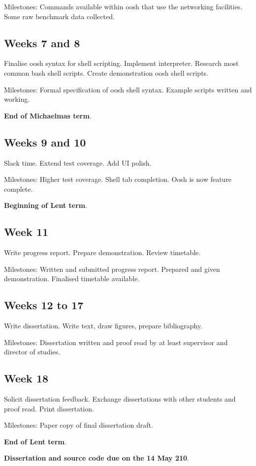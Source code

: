 \documentclass[12pt]{article}
\begin{document}
Milestones: Commands available within oosh that use the networking
facilities. Some raw benchmark data collected.

\subsection*{Weeks 7 and 8}
Finalise oosh syntax for shell scripting. Implement
interpreter. Research most common bash shell scripts. Create
demonstration oosh shell scripts.

Milestones: Formal specification of oosh shell syntax. Example scripts
written and working.

{\bf End of Michaelmas term}.

\subsection*{Weeks 9 and 10}
Slack time. Extend test coverage. Add UI polish.

Milestones: Higher test coverage. Shell tab completion. Oosh is now
feature complete.

{\bf Beginning of Lent term}.

\subsection*{Week 11}
Write progress report. Prepare demonstration. Review timetable.

Milestones: Written and submitted progress report. Prepared and given
demonstration. Finalised timetable available.

\subsection*{Weeks 12 to 17}
Write dissertation. Write text, draw figures, prepare bibliography.

Milestones: Dissertation written and proof read by at least supervisor
and director of studies.

\subsection*{Week 18}
Solicit dissertation feedback. Exchange dissertations with other
students and proof read. Print dissertation.

Milestones: Paper copy of final dissertation draft.

{\bf End of Lent term}.

{\bf Dissertation and source code due on the 14 May 210}.
\end{document}
